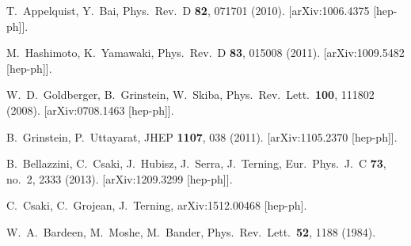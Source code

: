 \documentclass[twocolumn,secnumarabic,amssymb, nobibnotes, aps, prd]{revtex4}
\begin{document}
\begin{thebibliography}{99}

 

 

  T.~Appelquist, Y.~Bai,
  Phys.\ Rev.\ D {\bf 82}, 071701 (2010).
  [arXiv:1006.4375 [hep-ph]].
  
  M.~Hashimoto, K.~Yamawaki,
  Phys.\ Rev.\ D {\bf 83}, 015008 (2011).
  [arXiv:1009.5482 [hep-ph]].

  W.~D.~Goldberger, B.~Grinstein, W.~Skiba,
  Phys.\ Rev.\ Lett.\  {\bf 100}, 111802 (2008).
  [arXiv:0708.1463 [hep-ph]].
  
  
  B.~Grinstein, P.~Uttayarat,
  JHEP {\bf 1107}, 038 (2011).
  [arXiv:1105.2370 [hep-ph]].
  

  
  B.\ Bellazzini, C.\ Csaki, J.\ Hubisz, J.\ Serra, J.\ Terning,
  Eur.\ Phys.\ J.\ C {\bf 73}, no.\ 2, 2333 (2013).
  [arXiv:1209.3299 [hep-ph]].

  C.\ Csaki, C.\ Grojean, J.\ Terning,
  arXiv:1512.00468 [hep-ph].

  
   
 
   
   
  W.~A.~Bardeen, M.~Moshe, M.~Bander,
  Phys.\ Rev.\ Lett.\  {\bf 52}, 1188 (1984).


\end{thebibliography}
\end{document}
